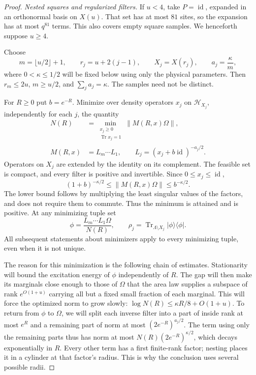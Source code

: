 \documentclass[11pt]{article}
\numberwithin{equation}{section}
\theoremstyle{definition}
\theoremstyle{remark}
\begin{document}
\begin{proof}
\emph{Nested squares and regularized filters.}
If \(u<4\), take \(P=\operatorname{id}\), expanded in an orthonormal basis on
\(X(u)\).  That set has at most \(81\) sites, so the expansion has
at most \(q^{81}\) terms.  This also covers empty square samples.
We henceforth suppose \(u\geq4\).

Choose
\[
 m=\lfloor u/2\rfloor+1,\qquad
 r_j=u+2(j-1),\qquad X_j=X(r_j),\qquad
 a_j=\frac{\kappa}{m},
\]
where \(0<\kappa\leq1/2\) will be fixed below using only the physical
parameters.  Then \(r_m\leq2u\), \(m\geq u/2\), and
\(\sum_j a_j=\kappa\).  The samples need not be distinct.

For \(R\geq0\) put \(b=e^{-R}\).  Minimize over density operators
\(x_j\) on \(\mathcal H_{X_j}\), independently for each \(j\), the
quantity
\begin{equation}
 \begin{split}
 N(R)&=\min_{\substack{x_j\geq0\\ \operatorname{Tr} x_j=1}}
               \lVert M(R,x)\Omega\rVert,\\
 M(R,x)&=L_m\cdots L_1,\qquad
 L_j=(x_j+b\operatorname{id})^{-a_j/2}.
 \end{split}
 \label{eq:patch-variational-problem}
\end{equation}
Operators on \(X_j\) are extended by the identity on its complement.
The feasible set is compact, and every filter is positive and
invertible.  Since \(0\leq x_j\leq\operatorname{id}\),
\begin{equation}
 (1+b)^{-\kappa/2}
       \leq \lVert M(R,x)\Omega\rVert
       \leq b^{-\kappa/2}.
 \label{eq:patch-elementary-norm-bounds}
\end{equation}
The lower bound follows by multiplying the least singular values of
the factors, and does not require them to commute.  Thus the minimum
is attained and is positive.  At any minimizing tuple set
\[
 \phi=\frac{L_m\cdots L_1\Omega}{N(R)},
 \qquad
 \rho_j=\operatorname{Tr}_{\Lambda\setminus X_j}
                \lvert\phi\rangle\langle\phi\rvert .
\]
All subsequent statements about minimizers apply to every minimizing
tuple, even when it is not unique.

The reason for this minimization is the following chain of estimates.
Stationarity will bound the excitation energy of $\phi$ independently
of $R$.  The gap will then make its marginals close enough to those of
$\Omega$ that the area law supplies a subspace of rank $e^{O(1+u)}$
carrying all but a fixed small fraction of each marginal.  This will force
the optimized norm to grow slowly:
$\log N(R)\le \kappa R/8+O(1+u)$.
To return from $\phi$ to $\Omega$, we will split each inverse filter
into a part of inside rank at most $e^R$ and a remaining part of norm at
most $(2e^{-R})^{a_j/2}$.  The term using only the remaining parts thus
has norm at most $N(R)(2e^{-R})^{\kappa/2}$, which decays exponentially
in $R$.  Every other term has a first finite-rank factor; nesting places
it in a cylinder at that factor's radius.  This is why the conclusion
uses several possible radii.


\end{proof}
\end{document}
